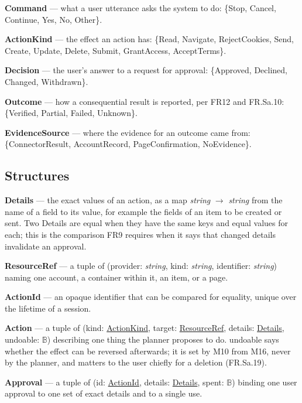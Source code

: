 \documentclass[12pt, titlepage]{article}
\newcommand{\str}{\textit{string}}
\newcommand{\B}{\mathbb{B}}
\begin{document}
\noindent\textbf{Command} \label{type:Command} --- what a user utterance asks
the system to do: \{Stop, Cancel, Continue, Yes, No, Other\}.

\noindent\textbf{ActionKind} \label{type:ActionKind} --- the effect an action
has: \{Read, Navigate, RejectCookies, Send, Create, Update, Delete, Submit,
GrantAccess, AcceptTerms\}.

\noindent\textbf{Decision} \label{type:Decision} --- the user's answer to a
request for approval: \{Approved, Declined, Changed, Withdrawn\}.

\noindent\textbf{Outcome} \label{type:Outcome} --- how a consequential result is
reported, per FR12 and FR.Sa.10: \{Verified, Partial, Failed, Unknown\}.

\noindent\textbf{EvidenceSource} \label{type:EvidenceSource} --- where the
evidence for an outcome came from: \{ConnectorResult, AccountRecord,
PageConfirmation, NoEvidence\}.

\subsection{Structures}

\noindent\textbf{Details} \label{type:Details} --- the exact values of an
action, as a map \str{} $\to$ \str{} from the name of a field to its value, for
example the fields of an item to be created or sent. Two Details are equal when
they have the same keys and equal values for each; this is the comparison FR9
requires when it says that changed details invalidate an approval.

\noindent\textbf{ResourceRef} \label{type:ResourceRef} --- a tuple of
(provider: \str, kind: \str, identifier: \str) naming one account, a container within it,
an item, or a page.

\noindent\textbf{ActionId} \label{type:ActionId} --- an opaque identifier that
can be compared for equality, unique over the lifetime of a session.

\noindent\textbf{Action} \label{type:Action} --- a tuple of (kind:
\hyperref[type:ActionKind]{ActionKind}, target:
\hyperref[type:ResourceRef]{ResourceRef}, details:
\hyperref[type:Details]{Details}, undoable: $\B$) describing one thing the
planner proposes to do. undoable says whether the effect can be reversed
afterwards; it is set by M10 from M16, never by the planner, and matters to the
user chiefly for a deletion (FR.Sa.19).

\noindent\textbf{Approval} \label{type:Approval} --- a tuple of (id:
\hyperref[type:ActionId]{ActionId}, details:
\hyperref[type:Details]{Details}, spent: $\B$) binding one user approval to one
set of exact details and to a single use.
\end{document}
